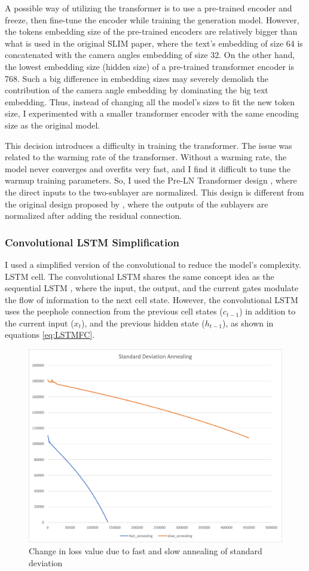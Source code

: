 \documentclass[11pt,a4paper]{article}
\begin{document}
A possible way of utilizing the transformer is to use a pre-trained encoder and freeze, then fine-tune the encoder while training the generation model. However, the tokens embedding size of the pre-trained encoders are relatively bigger than what is used in the original SLIM paper, where the text's embedding of size 64 is concatenated with the camera angles embedding of size 32. On the other hand, the lowest embedding size (hidden size) of a pre-trained transformer encoder is 768. Such a big difference in embedding sizes may severely demolish the contribution of the camera angle embedding by dominating the big text embedding. Thus, instead of changing all the model's sizes to fit the new token size, I experimented with a smaller transformer encoder with the same encoding size as the original model.

This decision introduces a difficulty in training the transformer. The issue was related to the warming rate of the transformer. Without a warming rate, the model never converges and overfits very fast, and I find it difficult to tune the warmup training parameters. So, I used the Pre-LN Transformer design \cite{xiong2020layer}, where the direct inputs to the two-sublayer are normalized. This design is different from the original design proposed by \citet{vaswani2017attention}, where the outputs of the sublayers are normalized after adding the residual connection.

\subsubsection{Convolutional LSTM Simplification}
I used a simplified version of the convolutional to reduce the model's complexity.
LSTM cell. The convolutional LSTM \cite{2015arXiv150604214S} shares the same concept idea as the sequential LSTM \cite{7508408}, where the input, the output, and the current gates modulate the flow of information to the next cell state. However, the convolutional LSTM uses the peephole connection from the previous cell states ($c_{t-1}$) \cite{2015arXiv150604214S} in addition to the current input ($x_t$), and the previous hidden state ($h_{t-1}$), as shown in equations \ref{eq:LSTMFC}.

\begin{figure}[t]
    \centering
    \includegraphics[width=.5\linewidth]{STD_Annlng.png}
    \caption{Change in loss value due to fast and slow annealing of standard deviation}
    \label{fig:stdannl}
\end{figure}
\end{document}

